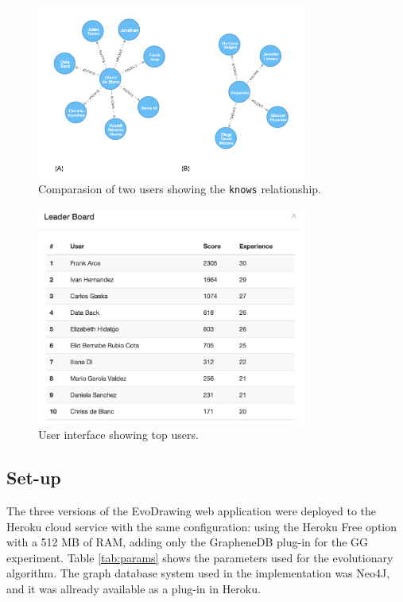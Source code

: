 \documentclass[conference]{IEEEtran}
\begin{document}
\begin{figure}[!t]
    \centering
        \includegraphics[width=3.5in]{img/users_known_1.png}
    \caption{Comparasion of two users showing the {\tt knows} relationship.}
    \label{fig:users-graph}
\end{figure}



\begin{figure}[!t]
    \centering
        \includegraphics[width=3.5in]{img/leaderBoard.png}
    \caption{User interface showing top users.}
    \label{fig:top-users}
\end{figure}



\subsection{Set-up}
\label{sec:setup}

The three versions of the EvoDrawing web application were deployed to the
Heroku cloud service with the same configuration: using the
Heroku Free option with a 512 MB of RAM, adding only the GrapheneDB plug-in for the GG experiment.
Table \ref{tab:params} shows the parameters used for the evolutionary algorithm. The graph database 
system used in the implementation was Neo4J, and it was allready available as a plug-in in Heroku.  
\end{document}
